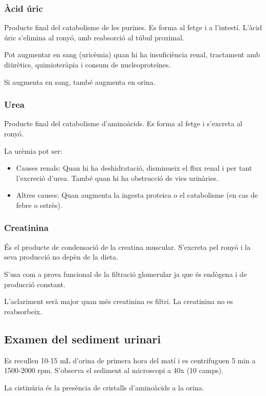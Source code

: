 \subsubsection{Àcid úric}
\label{sec:acid-uric}

Producte final del catabolisme de les purines. Es forma al fetge i a
l'intestí. L'àcid úric s'elimina al ronyó, amb reabsorció al túbul
proximal. 

Pot augmentar en sang (uricèmia) quan hi ha insuficiència renal,
tractament amb diürètics, quimioteràpia i consum de nucleoproteïnes.

Si augmenta en sang, també augmenta en orina.

\subsubsection{Urea}
\label{sec:urea}

Producte final del catabolisme d'aminoàcids. Es forma al fetge i
s'excreta al ronyó.

La urèmia pot ser:
\begin{itemize}
\item Causes renals: Quan hi ha deshidratació, disminueix el flux
  renal i per tant l'excreció d'urea. També quan hi ha obstrucció de
  vies urinàries.
\item Altres causes: Quan augmenta la ingesta proteica o el
  catabolisme (en cas de febre o estrès).
\end{itemize}

\subsubsection{Creatinina}
\label{sec:creatinina}

És el producte de condensació de la creatina muscular. S'excreta pel
ronyó i la seva producció no depèn de la dieta.

S'usa com a prova funcional de la filtració glomerular ja que és
endògena i de producció constant.

L'aclariment serà major quan més creatinina es filtri. La creatinina
no es reabsorbeix.

\subsection{Examen del sediment urinari}
\label{sec:examen-del-sediment}

Es recullen 10-15 mL d'orina de primera hora del matí i es
centrifuguen 5 min a 1500-2000 rpm. S'observa el sediment al
microscopi a 40x (10 camps).

La cistinúria és la presència de cristalls d'aminoàcids a la orina.